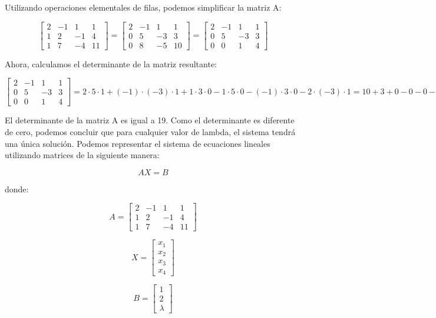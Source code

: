 Utilizando operaciones elementales de filas, podemos simplificar la matriz A:

\[ \begin{bmatrix} 
2 & -1 & 1 & 1 \\
1 & 2 & -1 & 4 \\
1 & 7 & -4 & 11
\end{bmatrix} 
= \begin{bmatrix} 
2 & -1 & 1 & 1 \\
0 & 5 & -3 & 3 \\
0 & 8 & -5 & 10
\end{bmatrix} 
= \begin{bmatrix} 
2 & -1 & 1 & 1 \\
0 & 5 & -3 & 3 \\
0 & 0 & 1 & 4
\end{bmatrix} \]

Ahora, calculamos el determinante de la matriz resultante:

\[ \begin{bmatrix} 
2 & -1 & 1 & 1 \\
0 & 5 & -3 & 3 \\
0 & 0 & 1 & 4
\end{bmatrix} 
= 2 \cdot 5 \cdot 1 + (-1) \cdot (-3) \cdot 1 + 1 \cdot 3 \cdot 0 - 1 \cdot 5 \cdot 0 - (-1) \cdot 3 \cdot 0 - 2 \cdot (-3) \cdot 1
= 10 + 3 + 0 - 0 - 0 - (-6)
= 19 \]

El determinante de la matriz A es igual a 19. Como el determinante es diferente de cero, podemos concluir que para cualquier valor de lambda, el sistema tendrá una única solución.
Podemos representar el sistema de ecuaciones lineales utilizando matrices de la siguiente manera:

\[ AX = B \]

donde:

\[ A = \begin{bmatrix} 
2 & -1 & 1 & 1 \\
1 & 2 & -1 & 4 \\
1 & 7 & -4 & 11
\end{bmatrix} \]

\[ X = \begin{bmatrix} 
x_1 \\
x_2 \\
x_3 \\
x_4
\end{bmatrix} \]

\[ B = \begin{bmatrix} 
1 \\
2 \\
\lambda
\end{bmatrix} \]


